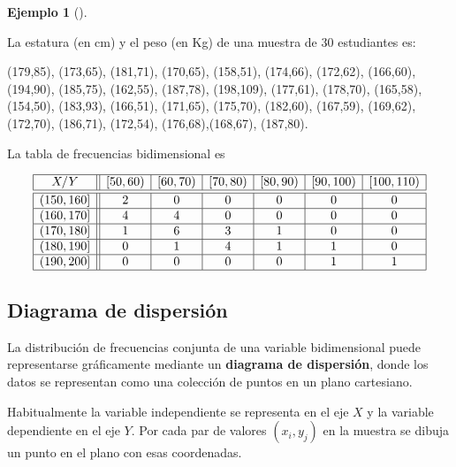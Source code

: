 \documentclass[
  a4paper,
]{scrreport}
\theoremstyle{plain}
\theoremstyle{definition}
\theoremstyle{definition}
\newtheorem{example}{Ejemplo}[chapter]
\theoremstyle{remark}
\begin{document}
\begin{example}[]\protect\hypertarget{exm-datos-agrupados}{}\label{exm-datos-agrupados}

La estatura (en cm) y el peso (en Kg) de una muestra de 30 estudiantes
es:

(179,85), (173,65), (181,71), (170,65), (158,51), (174,66), (172,62),
(166,60), (194,90), (185,75), (162,55), (187,78), (198,109), (177,61),
(178,70), (165,58), (154,50), (183,93), (166,51), (171,65), (175,70),
(182,60), (167,59), (169,62), (172,70), (186,71), (172,54),
(176,68),(168,67), (187,80).

La tabla de frecuencias bidimensional es

\[\begin{array}{|c||c|c|c|c|c|c|}
\hline
  X/Y & [50,60) & [60,70) & [70,80) & [80,90) & [90,100) & [100,110) \\
  \hline\hline
  (150,160] & 2 & 0 & 0 & 0 & 0 & 0 \\
  \hline
  (160,170] & 4 & 4 & 0 & 0 & 0 & 0 \\
  \hline
  (170,180] & 1 & 6 & 3 & 1 & 0 & 0 \\
  \hline
  (180,190] & 0 & 1 & 4 & 1 & 1 & 0 \\
  \hline
  (190,200] & 0 & 0 & 0 & 0 & 1 & 1 \\
  \hline
\end{array}\]

\end{example}

\subsection{Diagrama de dispersión}\label{diagrama-de-dispersiuxf3n}

La distribución de frecuencias conjunta de una variable bidimensional
puede representarse gráficamente mediante un \textbf{diagrama de
dispersión}, donde los datos se representan como una colección de puntos
en un plano cartesiano.

Habitualmente la variable independiente se representa en el eje \(X\) y
la variable dependiente en el eje \(Y\). Por cada par de valores
\((x_i,y_j)\) en la muestra se dibuja un punto en el plano con esas
coordenadas.
\end{document}
